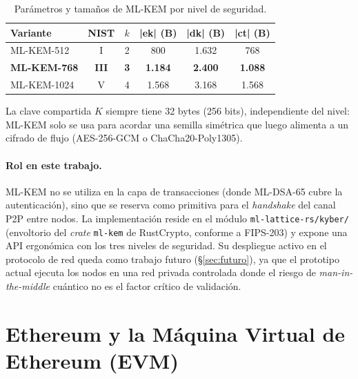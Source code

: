 \begin{table}[htbp]
\centering
\caption{Parámetros y tamaños de ML-KEM por nivel de seguridad.}
\label{tab:mlkem_params}
\begin{tabular}{@{}lccccc@{}}
\toprule
\textbf{Variante} & \textbf{NIST} & $k$ & \textbf{|ek| (B)} & \textbf{|dk| (B)} & \textbf{|ct| (B)} \\
\midrule
ML-KEM-512  & I   & 2 & 800   & 1.632 & 768   \\
\textbf{ML-KEM-768}  & \textbf{III} & \textbf{3} & \textbf{1.184} & \textbf{2.400} & \textbf{1.088} \\
ML-KEM-1024 & V   & 4 & 1.568 & 3.168 & 1.568 \\
\bottomrule
\end{tabular}
\end{table}

La clave compartida $K$ siempre tiene 32 bytes (256 bits), independiente del nivel: ML-KEM solo se usa para acordar una semilla simétrica que luego alimenta a un cifrado de flujo (AES-256-GCM o ChaCha20-Poly1305).

\paragraph{Rol en este trabajo.} ML-KEM no se utiliza en la capa de transacciones (donde ML-DSA-65 cubre la autenticación), sino que se reserva como primitiva para el \emph{handshake} del canal P2P entre nodos. La implementación reside en el módulo \texttt{ml-lattice-rs/kyber/} (envoltorio del \emph{crate} \texttt{ml-kem} de RustCrypto, conforme a FIPS-203) y expone una API ergonómica con los tres niveles de seguridad. Su despliegue activo en el protocolo de red queda como trabajo futuro (\S\ref{sec:futuro}), ya que el prototipo actual ejecuta los nodos en una red privada controlada donde el riesgo de \emph{man-in-the-middle} cuántico no es el factor crítico de validación.


\section{Ethereum y la Máquina Virtual de Ethereum (EVM)}
\label{sec:ethereum}


